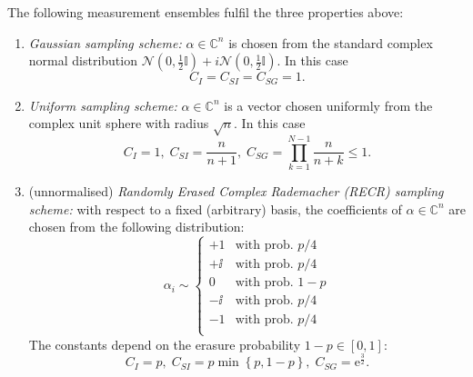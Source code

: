 \begin{proposition}%
  \label{prop:gauss+recr_requirements}
  The following measurement ensembles fulfil the three properties above:
  \begin{enumerate}

    \item \emph{Gaussian sampling scheme:} $\alpha \in \mathbb{C}^n$ is chosen from the standard complex normal distribution $\mathcal{N}(0,\tfrac{1}{2}\mathbb{I})+ i \mathcal{N}(0,\tfrac{1}{2}\mathbb{I})$. In this case
  \begin{equation*}
    C_I = C_{SI} = C_{SG} = 1.
  \end{equation*}

  \item \emph{Uniform sampling scheme:} $\alpha \in \mathbb{C}^n$ is a vector chosen uniformly from the complex unit sphere with radius $\sqrt{n}$. In this case
  \begin{equation*}
    C_I = 1, \; C_{SI} = \frac{n}{n+1}, \; C_{SG} = \prod_{k=1}^{N-1} \frac{n}{n+k} \leq 1.
  \end{equation*}

  \item (unnormalised) \emph{Randomly Erased Complex Rademacher (RECR) sampling scheme:} with respect to a fixed (arbitrary) basis, the coefficients of $\alpha \in \mathbb{C}^n$ are chosen from the following distribution:
  \begin{equation}
  \alpha_i \sim
  \begin{cases}
  +1 & \textrm{with prob. } p/4 \\
  +\ii & \textrm{with prob. } p/4 \\
  0 & \textrm{with prob. } 1-p \\
  -\ii & \textrm{with prob. } p/4 \\
  -1 & \textrm{with prob. } p/4 \\
  \end{cases}
  \label{eq:definition_recr}
  \end{equation}
  The constants depend on the erasure probability $1-p \in [0,1]$:
  \begin{equation*}
  C_I = p,\; C_{SI} = p \min \left\{p,1-p \right\}, \; C_{SG} = \mathrm{e}^{\frac{3}{2}}.
  \end{equation*}
  \end{enumerate}
\end{proposition}

